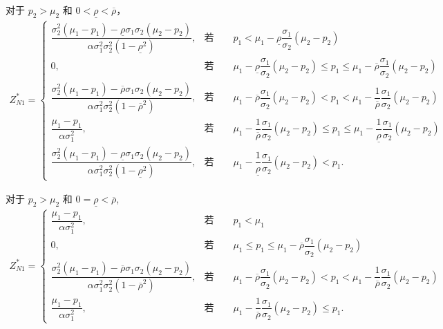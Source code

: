 \documentclass[10.0pt]{article}
\begin{document}
对于 $ p_2 > \mu_2 $ 和 $ 0 < \underline{\rho} < \overline{\rho} $，
{\footnotesize \begin{eqnarray}
Z_{N 1}^* = \left\{ \begin{matrix}
\dfrac{\sigma_2^2 (\mu_1 - p_1) - \underline{\rho} \sigma_1 \sigma_2 (\mu_2 - p_2)}{\alpha \sigma_1^2 \sigma_2^2 (1 - \underline{\rho}^2)}, & \text{若} \qquad p_1 < \mu_1 - \underline{\rho} \dfrac{\sigma_1}{\sigma_2} (\mu_2 - p_2) \\
0, & \text{若} \qquad \mu_1 - \underline{\rho} \dfrac{\sigma_1}{\sigma_2} (\mu_2 - p_2) \leqslant p_1 \leqslant \mu_1 - \overline{\rho} \dfrac{\sigma_1}{\sigma_2} (\mu_2 - p_2) \\
\dfrac{\sigma_2^2 (\mu_1 - p_1) - \overline{\rho} \sigma_1 \sigma_2 (\mu_2 - p_2)}{\alpha \sigma_1^2 \sigma_2^2 (1 - \overline{\rho}^2)}, & \text{若} \qquad \mu_1 - \overline{\rho} \dfrac{\sigma_1}{\sigma_2} (\mu_2 - p_2) < p_1 < \mu_1 - \dfrac1{\overline{\rho}} \dfrac{\sigma_1}{\sigma_2} (\mu_2 - p_2) \\
\dfrac{\mu_1 - p_1}{\alpha \sigma_1^2}, & \text{若} \qquad \mu_1 - \dfrac1{\overline{\rho}} \dfrac{\sigma_1}{\sigma_2} (\mu_2 - p_2) \leqslant p_1 \leqslant \mu_1 - \dfrac1{\underline{\rho}} \dfrac{\sigma_1}{\sigma_2} (\mu_2 - p_2) \\
\dfrac{\sigma_2^2 (\mu_1 - p_1) - \underline{\rho} \sigma_1 \sigma_2 (\mu_2 - p_2)}{\alpha \sigma_1^2 \sigma_2^2 (1 - \underline{\rho}^2)}, & \text{若} \qquad \mu_1 - \dfrac1{\underline{\rho}} \dfrac{\sigma_1}{\sigma_2} (\mu_2 - p_2) < p_1.
\end{matrix} \right.
\end{eqnarray}}

对于 $ p_2 > \mu_2 $ 和 $ 0 = \underline{\rho} < \overline{\rho} $,
{\footnotesize \begin{eqnarray}
Z_{N 1}^* = \left\{ \begin{matrix}
\dfrac{\mu_1 - p_1}{\alpha \sigma_1^2}, & \text{若} \qquad p_1 < \mu_1 \\
0, & \text{若} \qquad \mu_1 \leqslant p_1 \leqslant \mu_1 - \overline{\rho} \dfrac{\sigma_1}{\sigma_2} (\mu_2 - p_2) \\
\dfrac{\sigma_2^2 (\mu_1 - p_1) - \overline{\rho} \sigma_1 \sigma_2 (\mu_2 - p_2)}{\alpha \sigma_1^2 \sigma_2^2 (1 - \overline{\rho}^2)}, & \text{若} \qquad \mu_1 - \overline{\rho} \dfrac{\sigma_1}{\sigma_2} (\mu_2 - p_2) < p_1 < \mu_1 - \dfrac1{\overline{\rho}} \dfrac{\sigma_1}{\sigma_2} (\mu_2 - p_2) \\
\dfrac{\mu_1 - p_1}{\alpha \sigma_1^2}, & \text{若} \qquad \mu_1 - \dfrac1{\overline{\rho}} \dfrac{\sigma_1}{\sigma_2} (\mu_2 - p_2) \leqslant p_1.
\end{matrix} \right.
\end{eqnarray}}
\end{document}
